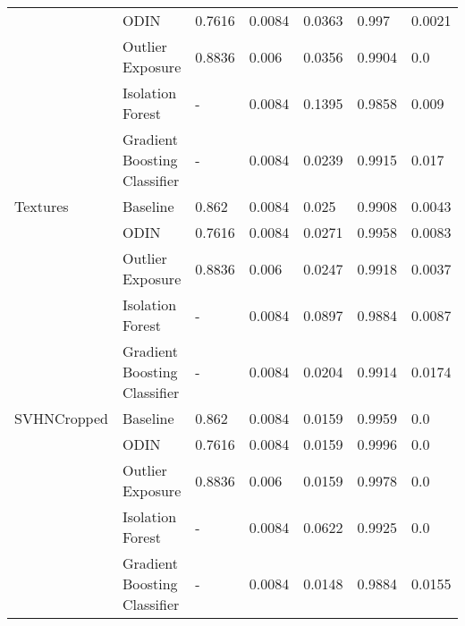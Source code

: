 \begin{tabular}{lllllll}
            & ODIN &        0.7616 &               0.0084 &    0.0363 &   0.997 &         0.0021 \\
            & Outlier Exposure &        0.8836 &                0.006 &    0.0356 &  0.9904 &            0.0 \\
            & Isolation Forest &             - &               0.0084 &    0.1395 &  0.9858 &          0.009 \\
            & Gradient Boosting Classifier &             - &               0.0084 &    0.0239 &  0.9915 &          0.017 \\
Textures & Baseline &         0.862 &               0.0084 &     0.025 &  0.9908 &         0.0043 \\
            & ODIN &        0.7616 &               0.0084 &    0.0271 &  0.9958 &         0.0083 \\
            & Outlier Exposure &        0.8836 &                0.006 &    0.0247 &  0.9918 &         0.0037 \\
            & Isolation Forest &             - &               0.0084 &    0.0897 &  0.9884 &         0.0087 \\
            & Gradient Boosting Classifier &             - &               0.0084 &    0.0204 &  0.9914 &         0.0174 \\
SVHNCropped & Baseline &         0.862 &               0.0084 &    0.0159 &  0.9959 &            0.0 \\
            & ODIN &        0.7616 &               0.0084 &    0.0159 &  0.9996 &            0.0 \\
            & Outlier Exposure &        0.8836 &                0.006 &    0.0159 &  0.9978 &            0.0 \\
            & Isolation Forest &             - &               0.0084 &    0.0622 &  0.9925 &            0.0 \\
            & Gradient Boosting Classifier &             - &               0.0084 &    0.0148 &  0.9884 &         0.0155 \\
\bottomrule
\end{tabular}
